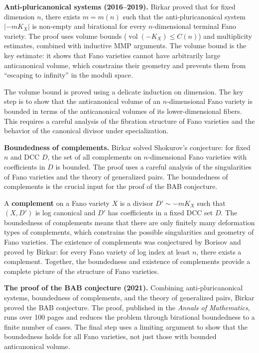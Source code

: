 \textbf{Anti-pluricanonical systems (2016--2019).} Birkar proved that for fixed dimension $n$, there exists $m = m(n)$ such that the anti-pluricanonical system $|-mK_X|$ is non-empty and birational for every $n$-dimensional terminal Fano variety. The proof uses volume bounds ($\operatorname{vol}(-K_X) \le C(n)$) and multiplicity estimates, combined with inductive MMP arguments. The volume bound is the key estimate: it shows that Fano varieties cannot have arbitrarily large anticanonical volume, which constrains their geometry and prevents them from ``escaping to infinity'' in the moduli space.

The volume bound is proved using a delicate induction on dimension. The key step is to show that the anticanonical volume of an $n$-dimensional Fano variety is bounded in terms of the anticanonical volumes of its lower-dimensional fibers. This requires a careful analysis of the fibration structure of Fano varieties and the behavior of the canonical divisor under specialization.

\textbf{Boundedness of complements.} Birkar solved Shokurov's conjecture: for fixed $n$ and DCC $D$, the set of all complements on $n$-dimensional Fano varieties with coefficients in $D$ is bounded. The proof uses a careful analysis of the singularities of Fano varieties and the theory of generalized pairs. The boundedness of complements is the crucial input for the proof of the BAB conjecture.

A \textbf{complement} on a Fano variety $X$ is a divisor $D' \sim -mK_X$ such that $(X, D')$ is log canonical and $D'$ has coefficients in a fixed DCC set $D$. The boundedness of complements means that there are only finitely many deformation types of complements, which constrains the possible singularities and geometry of Fano varieties. The existence of complements was conjectured by Borisov and proved by Birkar: for every Fano variety of log index at least $n$, there exists a complement. Together, the boundedness and existence of complements provide a complete picture of the structure of Fano varieties.

\textbf{The proof of the BAB conjecture (2021).} Combining anti-pluricanonical systems, boundedness of complements, and the theory of generalized pairs, Birkar proved the BAB conjecture. The proof, published in the \emph{Annals of Mathematics}, runs over 100 pages and reduces the problem through birational boundedness to a finite number of cases. The final step uses a limiting argument to show that the boundedness holds for all Fano varieties, not just those with bounded anticanonical volume.

